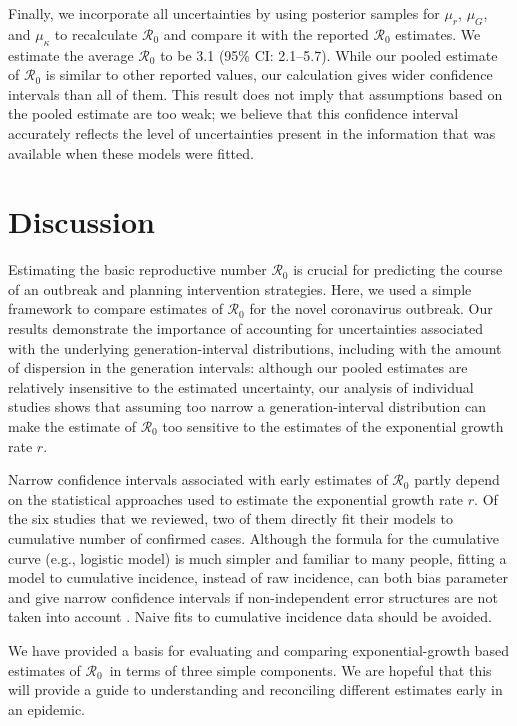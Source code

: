 \documentclass[12pt]{article}
\newcommand{\Rx}[1]{\ensuremath{{\mathcal R}_{#1}}}
\newcommand{\Ro}{\Rx{0}\xspace}
\begin{document}
Finally, we incorporate all uncertainties by using posterior samples for $\mu_r$, $\mu_G$, and $\mu_\kappa$ to recalculate \Ro and compare it with the reported \Ro estimates.
We estimate the average \Ro to be 3.1 (95\% CI: 2.1--5.7).
While our pooled estimate of \Ro is similar to other reported values, our calculation gives wider confidence intervals than all of them.
This result does not imply that assumptions based on the pooled estimate are too weak;
we believe that this confidence interval accurately reflects the level of uncertainties present in the information that was available when these models were fitted.

\section{Discussion}

Estimating the basic reproductive number \Ro is crucial for predicting the course of an outbreak and planning intervention strategies.
Here, we used a simple framework \citep{park2019practical} to compare estimates of \Ro for the novel coronavirus outbreak.
Our results demonstrate the importance of accounting for uncertainties associated with the underlying generation-interval distributions, including with the amount of dispersion in the generation intervals:
although our pooled estimates are relatively insensitive to the estimated uncertainty, our analysis of individual studies shows that assuming too narrow a generation-interval distribution can make the estimate of \Ro too sensitive to the estimates of the exponential growth rate $r$.

Narrow confidence intervals associated with early estimates of \Ro partly depend on the statistical approaches used to estimate the exponential growth rate $r$.
Of the six studies that we reviewed, two of them directly fit their models to cumulative number of confirmed cases.
Although the formula for the cumulative curve (e.g., logistic model) is much simpler and familiar to many people, fitting a model to cumulative incidence, instead of raw incidence, can both bias parameter and give narrow confidence intervals if non-independent error structures are not taken into account \citep{ma2014estimating, king2015avoidable}.
Naive fits to cumulative incidence data should be avoided.

We have provided a basis for evaluating and comparing exponential-growth based estimates of \Ro\ in terms of three simple components. We are hopeful that this will provide a guide to understanding and reconciling different estimates early in an epidemic.
\end{document}
